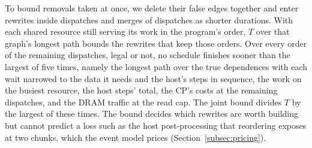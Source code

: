 To bound removals taken at once, we delete their false edges together and enter rewrites inside dispatches and merges of dispatches as shorter durations.
With each shared resource still serving its work in the program's order, $T$ over that graph's longest path bounds the rewrites that keep those orders.
Over every order of the remaining dispatches, legal or not, no schedule finishes sooner than the largest of five times, namely the longest path over the true dependences with each wait narrowed to the data it needs and the host's steps in sequence, the work on the busiest resource, the host steps' total, the CP's costs at the remaining dispatches, and the DRAM traffic at the read cap.
The joint bound divides $T$ by the largest of these times.
The bound decides which rewrites are worth building but cannot predict a loss such as the host post-processing that reordering exposes at two chunks, which the event model prices (Section~\ref{subsec:pricing}).

